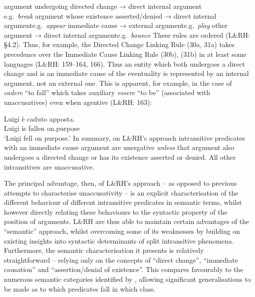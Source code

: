 \documentclass[output=paper]{langsci/langscibook}
\begin{document}
\ea
    \ea argument undergoing directed change → direct internal argument\\\hfill e.g.\ \emph{break}
    \ex argument whose existence asserted/denied → direct internal argument\hfill e.g.\ \emph{appear}
    \ex immediate cause → external argument\hfill e.g.\ \emph{play}
    \ex other argument → direct internal argument\hfill e.g.\ \emph{bounce}
    \z
\z
These rules are ordered (L\&RH: §4.2). Thus, for example, the Directed Change
Linking Rule (30a, 31a) takes precedence over the Immediate Cause Linking Rule
(30b), (31b) in at least some languages (L\&RH: 159–164, 166). Thus an entity
which both undergoes a direct change and is an immediate cause of the
eventuality is represented by an internal argument, not an external one. This
is apparent, for example, in the case of  \emph{cadere} \enquote{to
fall} which takes auxiliary \emph{essere} \enquote{to be} (associated with
unaccusatives) even when agentive (L\&RH: 163):

\ea {}
    \sn
    \gll Luigi   è   caduto   apposta.\\
        Luigi   is   fallen   on.purpose\\
    \glt \enquote*{Luigi fell on purpose.}
\z
In summary, on L\&RH’s approach intransitive predicates with an immediate cause
argument are unergative \emph{unless} that argument also undergoes a directed
change or has its existence asserted or denied. All other intransitives are
unaccusative.

The principal advantage, then, of L\&RH’s approach – as opposed to previous
attempts to characterise unaccusativity – is an explicit characterisation of
the different behaviour of different intransitive predicates in semantic terms,
whilst however directly relating these behaviours to the syntactic property of
the position of arguments. L\&RH are thus able to maintain certain advantages
of the \enquote{semantic} approach, whilst overcoming some of its weaknesses by
building on existing insights into syntactic determinants of split intransitive
phenomena. Furthermore, the semantic characterisation it presents is relatively
straightforward – relying only on the concepts of \enquote{direct change},
\enquote{immediate causation} and \enquote{assertion/denial of existence}. This
compares favourably to the numerous semantic categories identified by
\citet{Perlmutter1978}, allowing significant generalisations to be made as to
which predicates fall in which class.
\end{document}
